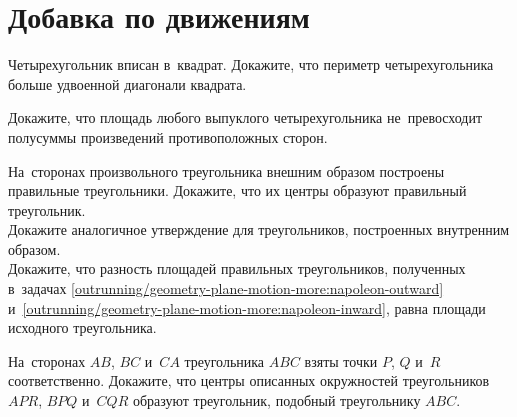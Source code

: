 
\section*{Добавка по движениям}


\begin{problems}

\item
Четырехугольник вписан в~квадрат.
Докажите, что периметр четырехугольника больше удвоенной диагонали квадрата.

\item
Докажите, что площадь любого выпуклого четырехугольника не~превосходит
полусуммы произведений противоположных сторон.

\item
\subproblem
\label{outrunning/geometry-plane-motion-more:napoleon-outward}%
На~сторонах произвольного треугольника внешним образом построены правильные
треугольники.
Докажите, что их центры образуют правильный треугольник.
\\
\subproblem
\label{outrunning/geometry-plane-motion-more:napoleon-inward}%
Докажите аналогичное утверждение для треугольников, построенных внутренним
образом.
\\
\subproblem
Докажите, что разность площадей правильных треугольников, полученных в~задачах
\ref{outrunning/geometry-plane-motion-more:napoleon-outward}
и~\ref{outrunning/geometry-plane-motion-more:napoleon-inward},
равна площади исходного треугольника.

\item
На~сторонах $AB$, $BC$ и~$CA$ треугольника $ABC$ взяты точки $P$, $Q$ и~$R$
соответственно.
Докажите, что центры описанных окружностей треугольников $APR$, $BPQ$ и~$CQR$
образуют треугольник, подобный треугольнику $ABC$.

\end{problems}

